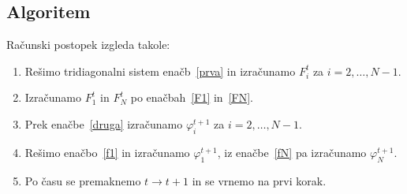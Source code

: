 \documentclass[a4 paper, 12pt]{article}
\newcommand{\vfi}{
    \ensuremath{\varphi}
}
\begin{document}
\subsection{Algoritem}
Ra\v cunski postopek izgleda takole:
\begin{enumerate}
    \item{Re\v simo tridiagonalni sistem ena\v cb~\eqref{prva} in izra\v cunamo $F^{t}_i$
        za $i = 2,\ldots,N-1$.}
    \item{Izra\v cunamo $F^t_1$ in $F^t_N$ po ena\v cbah~\eqref{F1} in~\eqref{FN}.}
    \item{Prek ena\v cbe~\eqref{druga} izra\v cunamo $\vfi^{t+1}_i$ za $i = 2,\ldots,N-1$.}
    \item{Re\v simo ena\v cbo~\eqref{f1} in izra\v cunamo $\vfi^{t+1}_1$, iz ena\v cbe~\eqref{fN} pa
        izra\v cunamo $\vfi^{t+1}_N$.}
    \item{Po \v casu se premaknemo $t \to t+1$ in se vrnemo na prvi korak.}
\end{enumerate}
\end{document}
